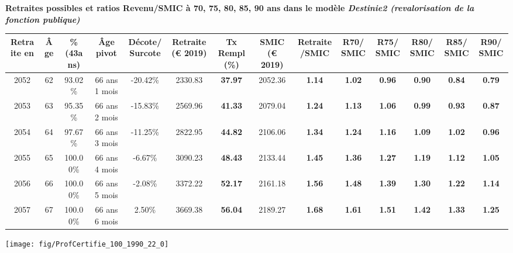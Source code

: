  \vspace{0.1cm} 
{\bf \noindent Retraites possibles et ratios Revenu/SMIC à 70, 75, 80, 85, 90 ans dans le modèle \emph{Destinie2 (revalorisation de la fonction publique)}}  
 
\begin{adjustbox}{max width=\textwidth} 
\begin{tabular}[htb]{|c|c||c|c|c||c|c||c|c||c|c|c|c|c|} 
\hline 
 Retraite en &  Âge &  \%(43ans) &  Âge pivot &  Décote/Surcote &  Retraite (\euro{} 2019) &  Tx Rempl(\%) &  SMIC (\euro{} 2019) &  Retraite/SMIC &  R70/SMIC &  R75/SMIC &  R80/SMIC &  R85/SMIC &  R90/SMIC \\ 
\hline \hline 
 2052 &  62 &  93.02\% &  66 ans 1 mois &  -20.42\% &  2330.83 &  {\bf 37.97} &  2052.36 &  {\bf 1.14} &  {\bf 1.02} &  {\bf {\color{red} 0.96}} &  {\bf {\color{red} 0.90}} &  {\bf {\color{red} 0.84}} &  {\bf {\color{red} 0.79}} \\ 
\hline 
 2053 &  63 &  95.35\% &  66 ans 2 mois &  -15.83\% &  2569.96 &  {\bf 41.33} &  2079.04 &  {\bf 1.24} &  {\bf 1.13} &  {\bf 1.06} &  {\bf {\color{red} 0.99}} &  {\bf {\color{red} 0.93}} &  {\bf {\color{red} 0.87}} \\ 
\hline 
 2054 &  64 &  97.67\% &  66 ans 3 mois &  -11.25\% &  2822.95 &  {\bf 44.82} &  2106.06 &  {\bf 1.34} &  {\bf 1.24} &  {\bf 1.16} &  {\bf 1.09} &  {\bf 1.02} &  {\bf {\color{red} 0.96}} \\ 
\hline 
 2055 &  65 &  100.00\% &  66 ans 4 mois &  -6.67\% &  3090.23 &  {\bf 48.43} &  2133.44 &  {\bf 1.45} &  {\bf 1.36} &  {\bf 1.27} &  {\bf 1.19} &  {\bf 1.12} &  {\bf 1.05} \\ 
\hline 
 2056 &  66 &  100.00\% &  66 ans 5 mois &  -2.08\% &  3372.22 &  {\bf 52.17} &  2161.18 &  {\bf 1.56} &  {\bf 1.48} &  {\bf 1.39} &  {\bf 1.30} &  {\bf 1.22} &  {\bf 1.14} \\ 
\hline 
 2057 &  67 &  100.00\% &  66 ans 6 mois &  2.50\% &  3669.38 &  {\bf 56.04} &  2189.27 &  {\bf 1.68} &  {\bf 1.61} &  {\bf 1.51} &  {\bf 1.42} &  {\bf 1.33} &  {\bf 1.25} \\ 
\hline 
\hline 
\end{tabular} 
\end{adjustbox} 
 
 \vspace{0.1cm} 

 {\hspace{-2.2cm}\texttt{[image: fig/ProfCertifie\_100\_1990\_22\_0]}} 

